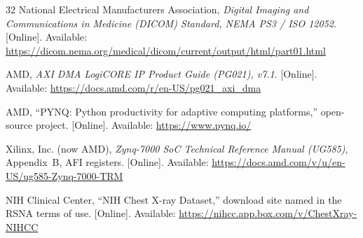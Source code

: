 \documentclass[conference]{IEEEtran}
\begin{document}
\begin{thebibliography}{32}
National Electrical Manufacturers Association, \emph{Digital Imaging and Communications in
Medicine ({DICOM}) Standard, {NEMA} {PS3} / {ISO} 12052}. [Online]. Available:
\url{https://dicom.nema.org/medical/dicom/current/output/html/part01.html}

AMD, \emph{{AXI DMA} {LogiCORE} {IP} Product Guide ({PG021}), v7.1}. [Online]. Available:
\url{https://docs.amd.com/r/en-US/pg021_axi_dma}

AMD, ``{PYNQ}: Python productivity for adaptive computing platforms,'' open-source project.
[Online]. Available: \url{https://www.pynq.io/}

Xilinx, Inc. (now AMD), \emph{Zynq-7000 {SoC} Technical Reference Manual ({UG585})},
Appendix~B, AFI registers. [Online]. Available:
\url{https://docs.amd.com/v/u/en-US/ug585-Zynq-7000-TRM}

NIH Clinical Center, ``{NIH} Chest X-ray Dataset,'' download site named in the RSNA terms of
use. [Online]. Available: \url{https://nihcc.app.box.com/v/ChestXray-NIHCC}

\end{thebibliography}
\end{document}
